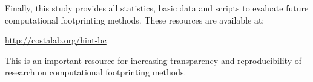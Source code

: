 Finally, this study provides all statistics, basic data and scripts to evaluate future computational footprinting methods. These resources are available at:

\begin{center}
\url{http://costalab.org/hint-bc}
\end{center}

This is an important resource for increasing transparency and reproducibility of research on computational footprinting methods.


